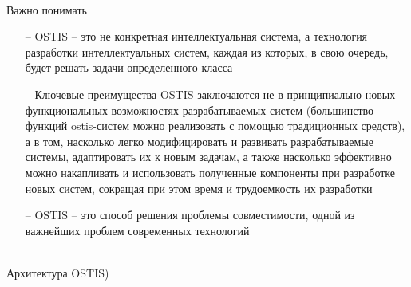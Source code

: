 \begin{frame}{\\Важно понимать}
	\vspace{10mm}
	\begin{itemize}
		\item [--] OSTIS -- это не конкретная интеллектуальная система, а технология разработки интеллектуальных систем, каждая из которых, в свою очередь, будет решать задачи определенного класса
		\item[--] Ключевые преимущества OSTIS заключаются не в принципиально новых функциональных возможностях разрабатываемых систем (большинство функций ostis-систем можно реализовать с помощью традиционных средств), а в том, насколько легко модифицировать и развивать разрабатываемые системы, адаптировать их к новым задачам, а также насколько эффективно можно накапливать и использовать полученные компоненты при разработке новых систем, сокращая при этом время и трудоемкость их разработки
		\item[--] OSTIS -- это способ решения проблемы совместимости, одной из важнейших проблем современных технологий
	\end{itemize}
\end{frame}	

\begin{frame}{\\Архитектура OSTIS})
	
\end{frame}